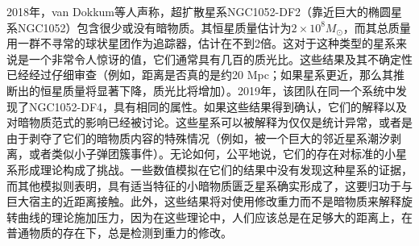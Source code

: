 
2018年，van Dokkum等人声称，超扩散星系NGC1052-DF2（靠近巨大的椭圆星系NGC1052）包含很少或没有暗物质。其恒星质量估计为$2 \times 10^8 M_\odot$，而其总质量用一群不寻常的球状星团作为追踪器，估计在不到2倍。这对于这种类型的星系来说是一个非常令人惊讶的值，它们通常具有几百的质光比。这些结果及其不确定性已经经过仔细审查（例如，距离是否真的是约20 Mpc；如果星系更近，那么其推断出的恒星质量将显著下降，质光比将增加）。2019年，该团队在同一个系统中发现了NGC1052-DF4，具有相同的属性。如果这些结果得到确认，它们的解释以及对暗物质范式的影响已经被讨论。这些星系可以被解释为仅仅是统计异常，或者是由于剥夺了它们的暗物质内容的特殊情况（例如，被一个巨大的邻近星系潮汐剥离，或者类似小子弹团簇事件）。无论如何，公平地说，它们的存在对标准的小星系形成理论构成了挑战。一些数值模拟在它们的结果中没有发现这种星系的证据，而其他模拟则表明，具有适当特征的小暗物质匮乏星系确实形成了，这要归功于与巨大宿主的近距离接触。此外，这些结果将对使用修改重力而不是暗物质来解释旋转曲线的理论施加压力，因为在这些理论中，人们应该总是在足够大的距离上，在普通物质的存在下，总是检测到重力的修改。